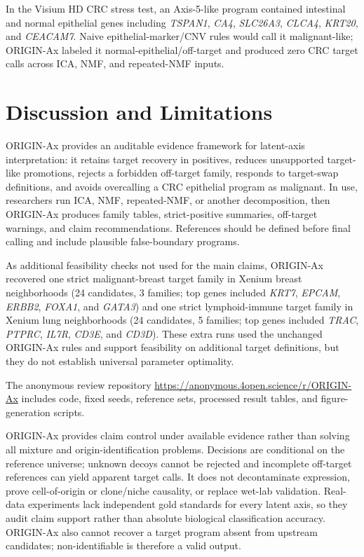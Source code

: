 \documentclass[conference]{IEEEtran}
\begin{document}
In the Visium HD CRC stress test, an Axis-5-like program contained intestinal
and normal epithelial genes including \textit{TSPAN1}, \textit{CA4},
\textit{SLC26A3}, \textit{CLCA4}, \textit{KRT20}, and \textit{CEACAM7}. Naive
epithelial-marker/CNV rules would call it malignant-like; ORIGIN-Ax labeled it
normal-epithelial/off-target and produced zero CRC target calls across ICA, NMF,
and repeated-NMF inputs.

\section{Discussion and Limitations}

ORIGIN-Ax provides an auditable evidence framework for latent-axis
interpretation: it retains target recovery in positives, reduces unsupported
target-like promotions, rejects a forbidden off-target family, responds to
target-swap definitions, and avoids overcalling a CRC epithelial program as
malignant. In use, researchers run ICA, NMF, repeated-NMF, or another
decomposition, then ORIGIN-Ax produces family tables, strict-positive summaries,
off-target warnings, and claim recommendations. References should be defined
before final calling and include plausible false-boundary programs.

As additional feasibility checks not used for the main claims, ORIGIN-Ax
recovered one strict malignant-breast target family in Xenium breast
neighborhoods (24 candidates, 3 families; top genes included \textit{KRT7},
\textit{EPCAM}, \textit{ERBB2}, \textit{FOXA1}, and \textit{GATA3}) and one
strict lymphoid-immune target family in Xenium lung neighborhoods (24
candidates, 5 families; top genes included \textit{TRAC}, \textit{PTPRC},
\textit{IL7R}, \textit{CD3E}, and \textit{CD3D}). These extra runs used the
unchanged ORIGIN-Ax rules and support feasibility on additional target
definitions, but they do not establish universal parameter optimality.

The anonymous review repository
\url{https://anonymous.4open.science/r/ORIGIN-Ax} includes code, fixed seeds,
reference sets, processed result tables, and figure-generation scripts.

ORIGIN-Ax provides claim control under available evidence rather than solving
all mixture and origin-identification problems. Decisions are conditional on the
reference universe; unknown decoys cannot be rejected and incomplete off-target
references can yield apparent target calls. It does not decontaminate
expression, prove cell-of-origin or clone/niche causality, or replace wet-lab
validation. Real-data experiments lack independent gold standards for every
latent axis, so they audit claim support rather than absolute biological
classification accuracy. ORIGIN-Ax also cannot recover a target program absent
from upstream candidates; non-identifiable is therefore a valid output.
\end{document}
